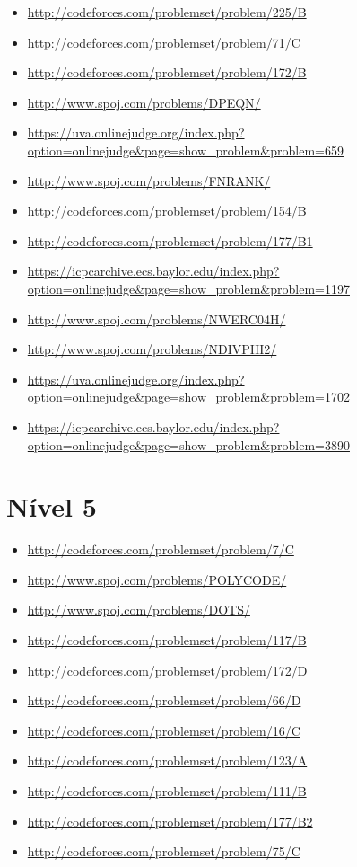 \begin{itemize}
\item \url{http://codeforces.com/problemset/problem/225/B}
\item \url{http://codeforces.com/problemset/problem/71/C}
\item \url{http://codeforces.com/problemset/problem/172/B}
\item \url{http://www.spoj.com/problems/DPEQN/}
\item \url{https://uva.onlinejudge.org/index.php?option=onlinejudge&page=show_problem&problem=659}
\item \url{http://www.spoj.com/problems/FNRANK/}
\item \url{http://codeforces.com/problemset/problem/154/B}
\item \url{http://codeforces.com/problemset/problem/177/B1}
\item \url{https://icpcarchive.ecs.baylor.edu/index.php?option=onlinejudge&page=show_problem&problem=1197}
\item \url{http://www.spoj.com/problems/NWERC04H/}
\item \url{http://www.spoj.com/problems/NDIVPHI2/}
\item \url{https://uva.onlinejudge.org/index.php?option=onlinejudge&page=show_problem&problem=1702}
\item \url{https://icpcarchive.ecs.baylor.edu/index.php?option=onlinejudge&page=show_problem&problem=3890}
\end{itemize}



\section{Nível 5}

\begin{itemize}
\item \url{http://codeforces.com/problemset/problem/7/C}
\item \url{http://www.spoj.com/problems/POLYCODE/}
\item \url{http://www.spoj.com/problems/DOTS/}
\item \url{http://codeforces.com/problemset/problem/117/B}
\item \url{http://codeforces.com/problemset/problem/172/D}
\item \url{http://codeforces.com/problemset/problem/66/D}
\item \url{http://codeforces.com/problemset/problem/16/C}
\item \url{http://codeforces.com/problemset/problem/123/A}
\item \url{http://codeforces.com/problemset/problem/111/B}
\item \url{http://codeforces.com/problemset/problem/177/B2}
\item \url{http://codeforces.com/problemset/problem/75/C}
\end{itemize}




